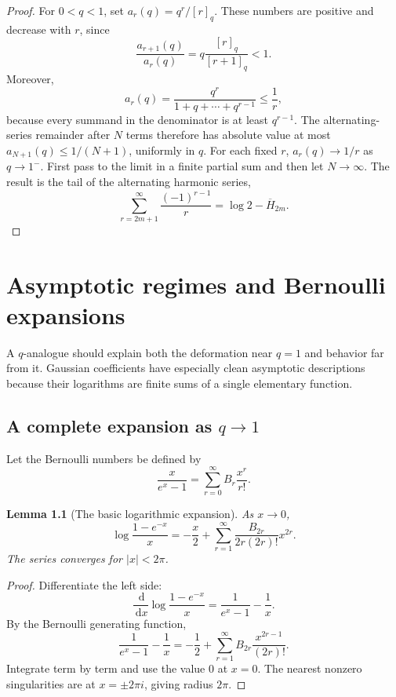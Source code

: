 \documentclass[11pt,oneside,openany]{book}
\newtheorem{lemma}[lemma]{Lemma}
\theoremstyle{definition}
\theoremstyle{remark}
\newcommand{\dd}{\,\mathrm d}
\newcommand{\abs}[1]{\lvert #1\rvert}
\begin{document}
\begin{proof}
For $0<q<1$, set $a_r(q)=q^r/[r]_q$.  These numbers are positive and decrease with $r$, since
\[
 \frac{a_{r+1}(q)}{a_r(q)}=q\frac{[r]_q}{[r+1]_q}<1.
\]
Moreover,
\[
 a_r(q)=\frac{q^r}{1+q+\cdots+q^{r-1}}
 \le\frac1r,
\]
because every summand in the denominator is at least $q^{r-1}$.  The alternating-series remainder after $N$ terms therefore has absolute value at most $a_{N+1}(q)\le1/(N+1)$, uniformly in $q$.  For each fixed $r$, $a_r(q)\to1/r$ as $q\to1^-$.  First pass to the limit in a finite partial sum and then let $N\to\infty$.  The result is the tail of the alternating harmonic series,
\[
 \sum_{r=2m+1}^{\infty}\frac{(-1)^{r-1}}r
 =\log2-\overline H_{2m}.
\]
\end{proof}

\chapter{Asymptotic regimes and Bernoulli expansions}\label{chap:asymptotics}

A $q$-analogue should explain both the deformation near $q=1$ and behavior far from it.  Gaussian coefficients have especially clean asymptotic descriptions because their logarithms are finite sums of a single elementary function.

\section{A complete expansion as \texorpdfstring{$q\to1$}{q to 1}}

Let the Bernoulli numbers be defined by
\[
 \frac{x}{e^x-1}=\sum_{r=0}^{\infty}B_r\frac{x^r}{r!}.
\]

\begin{lemma}[The basic logarithmic expansion]\label{lem:basic-bernoulli-log}
As $x\to0$,
\[
 \log\frac{1-e^{-x}}x
 =-\frac x2+
 \sum_{r=1}^{\infty}
 \frac{B_{2r}}{2r(2r)!}x^{2r}.
 \tag{19.1}\label{eq:basic-bernoulli-log}
\]
The series converges for $\abs x<2\pi$.
\end{lemma}

\begin{proof}
Differentiate the left side:
\[
 \frac{\dd}{\dd x}\log\frac{1-e^{-x}}x
 =\frac1{e^x-1}-\frac1x.
\]
By the Bernoulli generating function,
\[
 \frac1{e^x-1}-\frac1x
 =-\frac12+\sum_{r=1}^{\infty}
 B_{2r}\frac{x^{2r-1}}{(2r)!}.
\]
Integrate term by term and use the value $0$ at $x=0$.  The nearest nonzero singularities are at $x=\pm2\pi i$, giving radius $2\pi$.
\end{proof}
\end{document}
